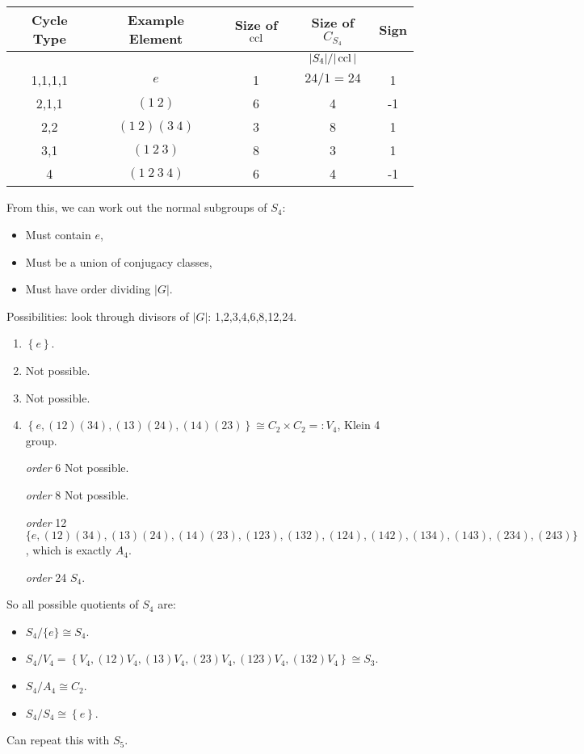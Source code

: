 \documentclass[10pt]{article}
\newcommand{\redcomment}[1]{{\color{red}#1}}
\begin{document}
      \begin{example}
        \begin{center}
            \begin{tabular}{c|c|c|c|c}
                Cycle Type & Example Element & Size of $\operatorname{ccl}$ & Size of $C_{S_4}$ & Sign \\
                \hline 
                & & & \redcomment{$ |S_4|/|\operatorname{ccl}| $} & \\
                1,1,1,1 & $e$ & 1 & $24/1=24$ &1 \\
                2,1,1 & $(1\ 2)$ & 6 & 4 &-1 \\
                2,2 & $(1\ 2)(3\ 4)$ & 3 & 8 &1 \\
                3,1 & $(1\ 2\ 3)$ & 8 & 3 &1 \\
                4 & $(1\ 2\ 3\ 4)$ & 6 & 4 &-1 \\
            \end{tabular}
        \end{center}
        From this, we can work out the normal subgroups of $S_4$:
        \begin{itemize}
            \item Must contain $e$,
            \item Must be a union of conjugacy classes,
            \item Must have order dividing $|G|$.
        \end{itemize}
        Possibilities: look through divisors of $|G|$: 1,2,3,4,6,8,12,24.
        \begin{enumerate}[align=hang, label=\textit{order} \arabic*]
            \item $ \left\{ e \right\} $.
            \item Not possible.
            \item Not possible.
            \item $ \left\{ e,(12)(34),(13)(24),(14)(23) \right\} \cong C_2 \times C_2=:V_4 $, Klein 4 group.
            \item[\textit{order} 6] Not possible.
            \item[\textit{order} 8] Not possible.
            \item[\textit{order} 12] $ \{e,(12)(34),(13)(24),(14)(23), (123), (132),(124),(142),(134),(143),(234),(243)\}$, which is exactly $A_4$.
            \item[\textit{order} 24] $S_4$. 
        \end{enumerate}
        So all possible quotients of $S_4$ are:
        \begin{itemize}
            \item $ S_4/\{e\}\cong S_4 $.
            \item $ S_4/V_4 = \left\{ V_4,(12)V_4,(13)V_4,(23)V_4,(123)V_4,(132)V_4 \right\} \cong S_3 $.
            \item $ S_4/A_4 \cong C_2 $.
            \item $ S_4/S_4 \cong \left\{ e \right\} $.
        \end{itemize}
        Can repeat this with $S_5$.
      \end{example}
\end{document}
